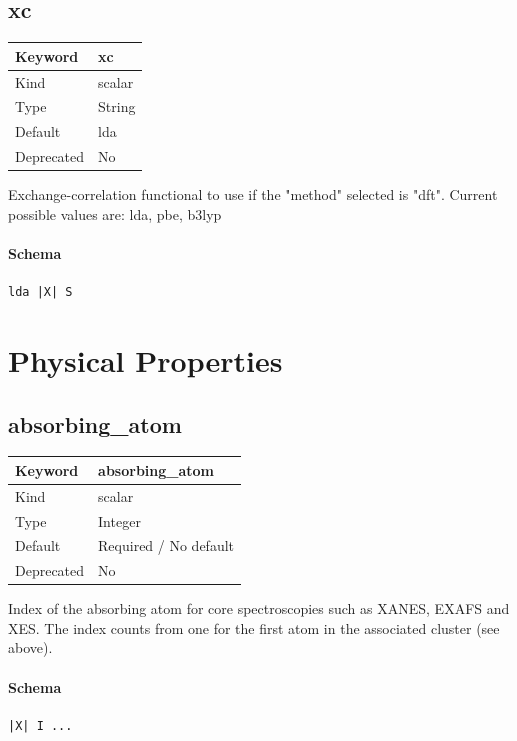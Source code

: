 \documentclass[11pt]{article}
\begin{document}
\subsection{xc}
\label{kw:xc}
\begin{longtable}{|p{1.5in}|p{4.5in}|}
\hline
Keyword & xc \\
\hline
Kind & scalar \\
\hline
Type & String \\
\hline
Default & lda \\
\hline
Deprecated & No \\
\hline
\end{longtable}
 Exchange-correlation functional to use if the "method" selected is "dft".
 Current possible values are:
    lda, pbe, b3lyp

\paragraph{Schema}
\begin{Verbatim}
lda |X| S
\end{Verbatim}

\section{Physical Properties}

\subsection{absorbing\_atom}
\label{kw:absorbing-atom}
\begin{longtable}{|p{1.5in}|p{4.5in}|}
\hline
Keyword & absorbing\_atom \\
\hline
Kind & scalar \\
\hline
Type & Integer \\
\hline
Default & Required / No default \\
\hline
Deprecated & No \\
\hline
\end{longtable}
 Index of the absorbing atom for core spectroscopies such as XANES, EXAFS and
 XES. The index counts from one for the first atom in the associated cluster (see above).

\paragraph{Schema}
\begin{Verbatim}
|X| I ...
\end{Verbatim}
\end{document}
